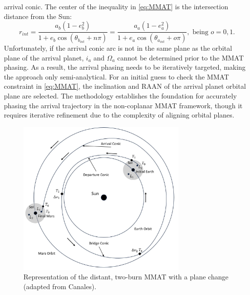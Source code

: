 arrival conic. The center of the inequality in \cref{eq:MMAT} is the intersection distance from the
Sun:
\begin{equation}
    r_{int}=\frac{a_{b}(1-e_{b}^{2})}{1+e_{b}\cos(\theta_{b_{int}}+n\pi)}=\frac{a_{a}(1-e_{a}^{2})}{1+e_{a}\cos(\theta_{a_{int}}+o\pi)}, \text{ being }o=0,1.
    \label{eq:intersect}
\end{equation}
Unfortunately, if the arrival conic arc is not in the same plane as the orbital plane of the
arrival planet, $i_{a}$ and $\Omega_{a}$ cannot be determined prior to the MMAT phasing. As a
result, the arrival phasing needs to be iteratively targeted, making the approach only
semi-analytical. For an initial guess to check the MMAT constraint in \cref{eq:MMAT}, the
inclination and RAAN of the arrival planet orbital plane are selected. The methodology establishes
the foundation for accurately phasing the arrival trajectory in the non-coplanar MMAT framework,
though it requires iterative refinement due to the complexity of aligning orbital planes.

\begin{figure}[H]
    \centering
    \includegraphics[width=0.75\textwidth]{figures/MMAT.jpg}
    \caption{Representation of the distant, two-burn MMAT with a plane change (adapted from Canales\cite{Canales:2021b}).}
    \label{fig:MMAT}
\end{figure}

